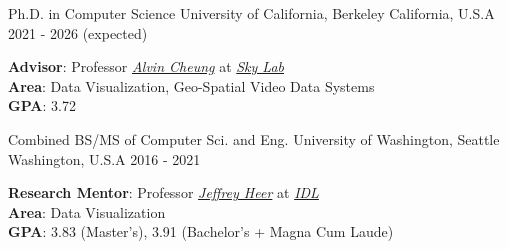 
\begin{cventries}

\vspace{-4.0mm}
\begin{multicols}{2}

  \cventrycol
    {Ph.D. in Computer Science} %
    {University of California, Berkeley} %
    {California, U.S.A} %
    {2021 - 2026 (expected)} %
    {
      \vspace{-4.0mm}
      \begin{justify}
        \textbf{Advisor}: Professor \href{https://people.eecs.berkeley.edu/~akcheung/}{\textit{Alvin Cheung}} at \href{https://sky.cs.berkeley.edu/}{\textit{Sky Lab}}\\
        \textbf{Area}: Data Visualization, Geo-Spatial Video Data Systems\\
        \textbf{GPA}: 3.72
      \end{justify}
    }
  \cventrycol
    {Combined BS/MS of Computer Sci. and Eng.} %
    {University of Washington, Seattle} %
    {Washington, U.S.A} %
    {2016 - 2021} %
    {
      \vspace{-4.0mm}
      \begin{justify}
        \textbf{Research Mentor}: Professor \href{https://homes.cs.washington.edu/~jheer/}{\textit{Jeffrey Heer}} at \href{https://idl.cs.washington.edu/}{\textit{IDL}}\\
        \textbf{Area}: Data Visualization\\
        \textbf{GPA}: 3.83 (Master's), 3.91 (Bachelor's + Magna Cum Laude)
      \end{justify}
    }
\end{multicols}
\vspace{-8mm}
    

\end{cventries}
